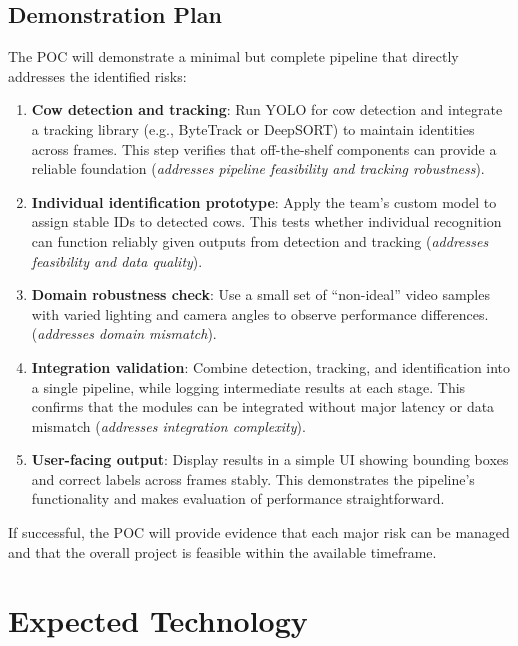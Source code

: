 \documentclass{article}
\begin{document}
\subsection*{Demonstration Plan}
The POC will demonstrate a minimal but complete pipeline that directly addresses the identified risks:  
\begin{enumerate}
  \item \textbf{Cow detection and tracking}: Run YOLO for cow detection and integrate a tracking library 
        (e.g., ByteTrack or DeepSORT) to maintain identities across frames.  
        This step verifies that off-the-shelf components can provide a reliable foundation 
        (\emph{addresses pipeline feasibility and tracking robustness}).  

  \item \textbf{Individual identification prototype}: Apply the team’s custom model to assign stable IDs 
        to detected cows.  
        This tests whether individual recognition can function reliably given outputs from detection and tracking 
        (\emph{addresses feasibility and data quality}).  

  \item \textbf{Domain robustness check}: Use a small set of “non-ideal” video samples with varied lighting 
        and camera angles to observe performance differences.  
        (\emph{addresses domain mismatch}).  

  \item \textbf{Integration validation}: Combine detection, tracking, and identification into a single pipeline, 
        while logging intermediate results at each stage.  
        This confirms that the modules can be integrated without major latency or data mismatch 
        (\emph{addresses integration complexity}).  

  \item \textbf{User-facing output}: Display results in a simple UI showing bounding boxes and correct labels 
        across frames stably. This demonstrates the pipeline’s functionality and makes evaluation of performance straightforward.  
\end{enumerate}

If successful, the POC will provide evidence that each major risk can be managed and that the overall project is feasible within the available timeframe.


\section{Expected Technology}
\end{document}
